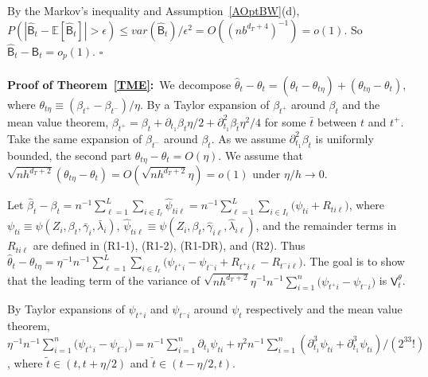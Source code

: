 \documentclass[lettersize, 12pt]{article}
\begin{document}
By the Markov's inequality and Assumption~\ref{AOptBW}(d), $P(|\hat{\mathsf{B}}_t - \mathbb{E}[\hat{\mathsf{B}}_t]| > \epsilon) \leq var(\hat{\mathsf{B}}_t)/\epsilon^2 = O((nb^{d_T+4})^{-1}) = o(1)$.
So $\hat{\mathsf{B}}_t - \mathsf{B}_t = o_p(1)$.
%
%
\hfill $\square$
\\ \\
\textbf{Proof of Theorem~\ref{TME}:}\
We decompose $\hat \theta_t - \theta_{t} = (\hat \theta_t - \theta_{t \eta}) + (\theta_{t \eta}  - \theta_{t})$,
where $\theta_{t \eta} \equiv ( \beta_{t^+} -  \beta_{t^-})/\eta$.
By a Taylor expansion of $\beta_{t^+}$ around $\beta_t$ and the mean value theorem, 
$\beta_{t^+} = \beta_t + \partial_{t_1}\beta_t \eta/2 + \partial_{t_1}^2 \beta_{\bar t} \eta^2/4$ for some $\bar t$ between $t$ and $t^+$.
Take the same expansion of  $\beta_{t^-}$ around $\beta_t$.
As we assume $\partial_{t_1}^2 \beta_{t}$ is uniformly bounded, the second part $\theta_{t \eta}  - \theta_{t} = O(\eta)$.
We assume that $\sqrt{nh^{d_T + 2}}(\theta_{t\eta} - \theta_{t}) = 
O(\sqrt{nh^{d_T + 2}} \eta) = o(1)$ under $\eta/h \rightarrow 0$.


Let $\hat \beta_t -\beta_t = n^{-1}\sum_{\ell=1}^L \sum_{i \in I_\ell} \hat \psi_{ti\ell}  = n^{-1}\sum_{\ell=1}^L \sum_{i \in I_\ell} \big(\psi_{ti} + R_{ti\ell}\big)$, where 
$\psi_{ti} \equiv \psi(Z_i, \beta_t, \bar\gamma_i, \bar \lambda_i)$, $\hat \psi_{ti\ell} \equiv \psi(Z_i, \beta_t, \hat \gamma_{i\ell}, \hat \lambda_{i\ell})$, and the remainder terms in $R_{ti\ell}$ are defined in (R1-1), (R1-2), (R1-DR), and (R2).  %
Thus $\hat \theta_t - \theta_{t \eta} = \eta^{-1} n^{-1}\sum_{\ell=1}^L \sum_{i \in I_\ell} \big(\psi_{t^+i} - \psi_{t^-i} + R_{t^+i\ell} - R_{t^-i\ell}\big)$.
The goal is to show that the leading term of the variance of $\sqrt{nh^{d_T + 2}}\eta^{-1} n^{-1}\sum_{i=1}^n\big( \psi_{t^+i} - \psi_{t^-i}\big)$ is 
$\mathsf{V}_t^\theta$.



By Taylor expansions of  $\psi_{t^+i}$ and $\psi_{t^-i}$ around $\psi_{t}$ respectively and the mean value theorem, 
$\eta^{-1} n^{-1}\sum_{i=1}^n \big( \psi_{t^+i} - \psi_{t^-i}\big)
=
n^{-1}\sum_{i=1}^n \partial_{t_1}\psi_{ti} +  \eta^2 n^{-1}\sum_{i=1}^n  (\partial_{t_1}^3\psi_{\tilde ti}+ \partial_{t_1}^3\psi_{\check t i})/(2^33!)$,   
where $\tilde t \in (t, t+\eta/2)$ and $\check t \in (t-\eta/2, t)$.
\end{document}
